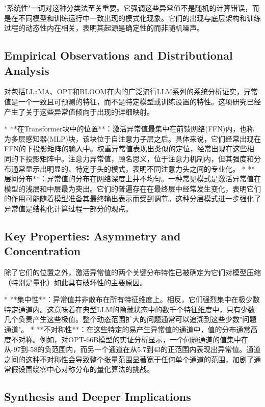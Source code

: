 \documentclass{article}
\begin{document}
"系统性"一词对这种分类法至关重要。它强调这些异常值不是随机的计算错误，而是在不同模型和训练运行中一致出现的模式化现象。它们的出现与底层架构和训练过程的动态性内在相关，表明其起源是确定性的而非随机噪声。

\subsection{Empirical Observations and Distributional Analysis}

对包括LLaMA、OPT和BLOOM在内的广泛流行LLM系列的系统分析证实，异常值是一个一致且可预测的特征，而不是特定模型或训练设置的特性。这项研究已经产生了关于这些异常值倾向于出现的详细映射。

* **在Transformer块中的位置**：激活异常值最集中在前馈网络(FFN)内，也称为多层感知器(MLP)块，该块位于自注意力子层之后。具体来说，它们经常出现在FFN的下投影矩阵的输入中。权重异常值表现出类似的定位，经常出现在这些相同的下投影矩阵中。注意力异常值，顾名思义，位于注意力机制内，但其强度和分布通常显示出明显的、特定于头的模式，表明不同注意力头之间的专业化。
* **层间分布**：异常值的分布在网络深度上并不均匀。一种常见模式是激活异常值在模型的浅层和中层最为突出。它们的普遍存在在最终层中经常发生变化，表明它们的作用可能随着模型准备其最终输出表示而受到调节。这种分层模式进一步强化了异常值是结构化计算过程一部分的观点。

\subsection{Key Properties: Asymmetry and Concentration}

除了它们的位置之外，激活异常值的两个关键分布特性已被确定为它们对模型压缩（特别是量化）如此具有破坏性的主要原因。

* **集中性**：异常值并非散布在所有特征维度上。相反，它们强烈集中在极少数特定通道内。这意味着在典型LLM的隐藏状态中的数千个特征维度中，只有少数几个负责产生这些极值。整个动态范围扩大的问题通常可以追溯到这些少数"问题通道"。
* **不对称性**：在这些特定的易产生异常值的通道中，值的分布通常高度不对称。例如，对OPT-66B模型的实证分析显示，一个问题通道的值集中在从-97到-58的负范围内，而另一个通道在从5.7到43的正范围内表现出异常值。通道之间的这种不对称性会导致整个张量范围显著宽于任何单个通道的范围，加剧了通常假设围绕零中心对称分布的量化算法的挑战。

\subsection{Synthesis and Deeper Implications}
\end{document}
